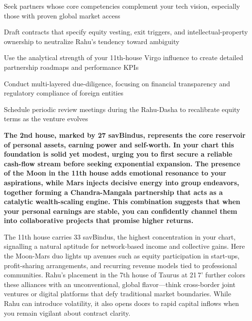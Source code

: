 \begin{diamondlist}
  \item {\fontsize{8.5}{12}\selectfont Seek partners whose core competencies complement your tech vision, especially those with proven global market access}
  \item {\fontsize{8.5}{12}\selectfont Draft contracts that specify equity vesting, exit triggers, and intellectual-property ownership to neutralize Rahu's tendency toward ambiguity}
  \item {\fontsize{8.5}{12}\selectfont Use the analytical strength of your 11th-house Virgo influence to create detailed partnership roadmaps and performance KPIs}
  \item {\fontsize{8.5}{12}\selectfont Conduct multi-layered due-diligence, focusing on financial transparency and regulatory compliance of foreign entities}
  \item {\fontsize{8.5}{12}\selectfont Schedule periodic review meetings during the Rahu-Dasha to recalibrate equity terms as the venture evolves}
\end{diamondlist}


\label{topic52}

{\fontsize{9.5}{13.8}\selectfont\bfseries\color{DeepSlate} The 2nd house, marked by 27 savBindus, represents the core reservoir of personal assets, earning power and self-worth. In your chart this foundation is solid yet modest, urging you to first secure a reliable cash-flow stream before seeking exponential expansion. The presence of the Moon in the 11th house adds emotional resonance to your aspirations, while Mars injects decisive energy into group endeavors, together forming a Chandra-Mangala partnership that acts as a catalytic wealth-scaling engine. This combination suggests that when your personal earnings are stable, you can confidently channel them into collaborative projects that promise higher returns.}\par\vspace{2mm}

{\fontsize{9}{13}\selectfont The 11th house carries 33 savBindus, the highest concentration in your chart, signalling a natural aptitude for network-based income and collective gains. Here the Moon-Mars duo lights up avenues such as equity participation in start-ups, profit-sharing arrangements, and recurring revenue models tied to professional communities. Rahu's placement in the 7th house of Taurus at 21\textdegree{} 7' further colors these alliances with an unconventional, global flavor---think cross-border joint ventures or digital platforms that defy traditional market boundaries. While Rahu can introduce volatility, it also opens doors to rapid capital inflows when you remain vigilant about contract clarity.}\par\vspace{1.8mm}

